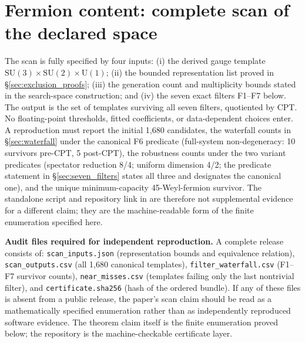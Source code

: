 \documentclass[11pt]{article}
\theoremstyle{definition}
\newcommand{\SU}{\mathrm{SU}}
\newcommand{\U}{\mathrm{U}}
\begin{document}
\section{Fermion content: complete scan of the declared space}
\label{sec:fermion_scan}

\begin{tcolorbox}[apfbox, title={Reproducibility contract for the 1{,}680-template scan}]
\footnotesize
The scan is fully specified by four inputs: (i) the derived gauge template
$\SU(3)\times\SU(2)\times\U(1)$; (ii) the bounded representation list
proved in \S\ref{sec:exclusion_proofs}; (iii) the generation count and
multiplicity bounds stated in the search-space construction; and (iv) the
seven exact filters F1--F7 below.  The output is the set of templates
surviving all seven filters, quotiented by CPT.  No floating-point
thresholds, fitted coefficients, or data-dependent choices enter.  A
reproduction must report the initial 1{,}680 candidates, the waterfall
counts in \S\ref{sec:waterfall} under the canonical F6 predicate
(full-system non-degeneracy: 10 survivors pre-CPT, 5 post-CPT), the
robustness counts under the two variant predicates (spectator
reduction 8/4; uniform dimension 4/2; the predicate statement in
\S\ref{sec:seven_filters} states all three and designates the
canonical one), and the unique minimum-capacity 45-Weyl-fermion
survivor.
The standalone script and repository link in \cite{BrookeFermionScan} are
therefore not supplemental evidence for a different claim; they are the
machine-readable form of the finite enumeration specified here.

\smallskip\noindent\textbf{Audit files required for independent reproduction.}\quad
A complete release consists of: \texttt{scan\_inputs.json} (representation
bounds and equivalence relation), \texttt{scan\_outputs.csv} (all 1{,}680
canonical templates), \texttt{filter\_waterfall.csv} (F1--F7 survivor counts),
\texttt{near\_misses.csv} (templates failing only the last nontrivial filter),
and \texttt{certificate.sha256} (hash of the ordered bundle).  If any of these
files is absent from a public release, the paper's scan claim should be read as
a mathematically specified enumeration rather than as independently reproduced
software evidence.  The theorem claim itself is the finite enumeration proved
below; the repository is the machine-checkable certificate layer.
\end{tcolorbox}
\end{document}
